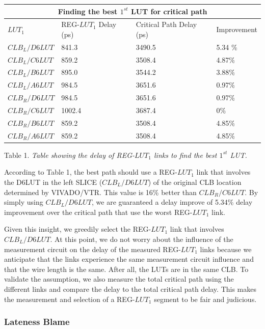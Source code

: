 \documentclass[11pt]{report}
\begin{document}
\begin{mainf}
\begin{tabular}{ |p{4cm}||p{4cm}|p{4cm}|p{4cm}|  }
 \hline
 \multicolumn{4}{|c|}{Finding the best $1^{st}$ LUT for critical path} \\
 \hline
 $LUT_1$& REG-$LUT_1$ Delay (ps) &Critical Path Delay (ps)& Improvement \\
 \hline
 $CLB_L/D6LUT$   &    841.3 &3490.5& 5.34 \%\\
 $CLB_L/C6LUT $&   859.2  & 3508.4&4.87\% \\
 $CLB_L/B6LUT $ &895.0 & 3544.2&3.88\%\\
 $CLB_L/A6LUT $ &984.5& 3651.6&0.97\%\\
 $CLB_R/D6LUT $&   984.5  & 3651.6&0.97\%\\
 $CLB_R/C6LUT $& 1002.4  & 3687.4&0\% \\
 $CLB_R/B6LUT $& 859.2  & 3508.4&4.85\%\\
 $CLB_R/A6LUT $& 859.2  & 3508.4&4.85\%\\
 \hline
\end{tabular}

 Table 1. \textit{Table showing the delay of REG-$LUT_1$ links to find the best $1^{st}$ LUT. }

 

 According to Table 1, the best path should use a REG-$LUT_1$ link that involves the D6LUT in the left SLICE ($CLB_L/D6LUT$) of the original CLB location determined by VIVADO/VTR. This value is 16\% better than $CLB_R/C6LUT$. By simply using $CLB_L/D6LUT$, we are guaranteed a delay improve of 5.34\% delay improvement over the critical path that use the worst REG-$LUT_1$ link. 

 Given this insight, we greedily select the REG-$LUT_1$ link that involves $CLB_L/D6LUT$. At this point, we do not worry about the influence of the measurement circuit on the delay of the measured REG-$LUT_1$ links because we anticipate that the links experience the same measurement circuit influence and that the wire length is the same. After all, the LUTs are in the same CLB. To validate the assumption, we also measure the total critical path using the different links and compare the delay to the total critical path delay. This makes the measurement and selection of a REG-$LUT_1$ segment to be fair and judicious. 

\subsubsection{Lateness Blame}


\end{mainf}
\end{document}
